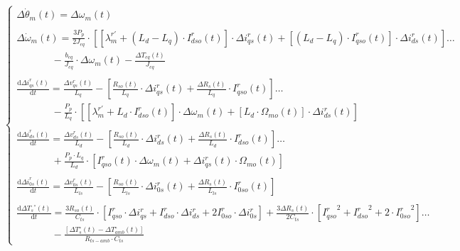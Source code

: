 \documentclass[10pt]{article}
\begin{document}
\begin{enumerate}
	\newline
	\begin{equation}
		\label{eqn:sistPequeniasDesviaciones}
		\begin{cases}
			\Delta\dot{\theta}_{m}(t)=\Delta\omega_{m}(t)
			\\
			\\
			\Delta\dot{\omega }_{m}(t)=\frac{3 P_{p}}{2 J_{eq}}\cdot \left [[\lambda_{m}^{r'}+\left ( L_{d}-L_{q} \right )\cdot I_{dso}^{r} (t)]\cdot\Delta i_{qs}^{r}(t)+[\left ( L_{d}-L_{q} \right )\cdot I_{qso}^{r}(t)]\cdot\Delta i_{ds}^{r} (t)\right ]\dots \\  \ \ \ \ \ \ \  \  \ \  \ \  \ \ \ \ - \frac{b_{eq}}{J_{eq}}\cdot\Delta\omega_{m}(t)-\frac{\Delta T_{eq}(t)}{J_{eq}}
			\\
			\\
			\frac{\mathrm{d} \Delta i_{qs}^{r}\left ( t \right )}{\mathrm{d} t}=\frac{\Delta v_{qs}^{r}(t)}{L_{q}}-\left [ \frac{R_{so}\left ( t \right )}{L_{q}}\cdot \Delta i_{qs}^{r}(t)+\frac{\Delta R_{s}(t)}{L_{q}}\cdot I_{qso}^{r}(t) \right ]\dots \\ \ \ \ \ \ \ \  \  \ \  \ \  \ \ \ \ -\frac{P_{p}}{L_{q}}\cdot\left [[\lambda_{m}^{r'}+L_{d}\cdot I_{dso}^{r}(t)]\cdot\Delta \omega_{m}(t)+[L_{d}\cdot \Omega_{mo}(t)]\cdot \Delta i_{ds}^{r}(t)\right ]
			\\
			\\
			\frac{\mathrm{d}\Delta i_{ds}^{r}\left ( t \right )}{\mathrm{d} t}=\frac{\Delta v_{ds}^{r}(t)}{L_{d}}-\left [ \frac{R_{so}\left ( t \right )}{L_{d}}\cdot \Delta i_{ds}^{r}(t)+\frac{\Delta R_{s}\left ( t \right )}{L_{d}}\cdot I_{dso}^{r}(t) \right ]\dots \\ \ \ \ \ \ \ \  \  \ \  \ \  \ \ \ \ +\frac{P_{p}\cdot L_{q}}{L_{d}}\cdot\left [  I_{qso}^{r}(t)\cdot \Delta\omega_{m}(t)+\Delta i_{qs}^{r}(t)\cdot \Omega_{mo}(t) \right ]
			\\
			\\
			\frac{\mathrm{d}\Delta i_{0s}^{r}\left ( t \right )}{\mathrm{d} t}=\frac{\Delta v_{0s}^{r}(t)}{L_{ls}}-\left [ \frac{R_{so}\left ( t \right )}{L_{ls}}\cdot \Delta i_{0s}^{r}(t)+\frac{\Delta R_{s}\left ( t \right )}{L_{ls}}\cdot I_{0so}^{r}(t) \right ]
			\\
			\\
			\frac{\mathrm{d} {\Delta T_{s}}^{\circ}\left ( t \right )}{\mathrm{d} t}=\frac{3R_{so}(t)}{C_{ts}}\cdot \left [ I_{qso}^{r} \cdot \Delta i_{qs}^{r}+I_{dso}^{r} \cdot \Delta i_{ds}^{r}+2I_{0so}^{r} \cdot \Delta i_{0s}^{r} \right ]+\frac{3\Delta R_{s}(t)}{2 C_{ts}}\cdot\left [ {I_{qso}^{r}}^{2}+{I_{dso}^{r}}^{2}+2\cdot{I_{0so}^{r}}^{2} \right ]\dots \\ \ \ \ \ \ \ \  \  \ \  \ \  \ \ \ \ -\frac{\left [\Delta T_{s}^{\circ}\left ( t \right )  - \Delta T_{amb}^{\circ}\left ( t \right ) \right ]}{R_{ts-amb}\cdot C_{ts}}

\end{cases}
\end{equation}
\end{enumerate}
\end{document}
